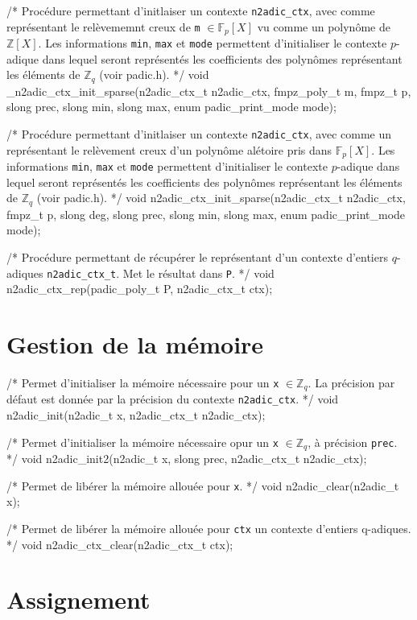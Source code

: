 \documentclass[11pt]{article}
\begin{document}
/* Procédure permettant d'initlaiser un contexte \texttt{n2adic_ctx}, avec comme représentant le relèvememnt creux de \texttt{m} $\in \mathbb{F}_p[X]$ vu comme un polynôme de $\mathbb{Z}[X]$. Les informations \texttt{min}, \texttt{max} et \texttt{mode} permettent d'initialiser le contexte $p$-adique dans lequel seront représentés les coefficients des polynômes représentant les éléments de $\mathbb{Z}_q$ (voir padic.h). */
void _n2adic_ctx_init_sparse(n2adic_ctx_t n2adic_ctx, fmpz_poly_t m, fmpz_t p, slong prec, slong min, slong max, enum padic_print_mode mode);

/* Procédure permettant d'initlaiser un contexte \texttt{n2adic_ctx}, avec comme un représentant le relèvement creux d'un polynôme alétoire pris dans $\mathbb{F}_p[X]$. Les informations \texttt{min}, \texttt{max} et \texttt{mode} permettent d'initialiser le contexte $p$-adique dans lequel seront représentés les coefficients des polynômes représentant les éléments de $\mathbb{Z}_q$ (voir padic.h). */
void n2adic_ctx_init_sparse(n2adic_ctx_t n2adic_ctx, fmpz_t p, slong deg, slong prec, slong min, slong max, enum padic_print_mode mode);

/* Procédure permettant de récupérer le représentant d'un contexte d'entiers $q$-adiques \texttt{n2adic_ctx_t}. Met le résultat dans \texttt{P}. */
void n2adic_ctx_rep(padic_poly_t P, n2adic_ctx_t ctx);


\section{Gestion de la mémoire}

/* Permet d'initialiser la mémoire nécessaire pour un \texttt{x} $\in \mathbb{Z}_q$. La précision par défaut est donnée par la précision du contexte \texttt{n2adic_ctx}. */
void n2adic_init(n2adic_t x, n2adic_ctx_t n2adic_ctx);

/* Permet d'initialiser la mémoire nécessaire opur un \texttt{x} $\in \mathbb{Z}_q$, à précision \texttt{prec}. */
void n2adic_init2(n2adic_t x, slong prec, n2adic_ctx_t n2adic_ctx);

/* Permet de libérer la mémoire allouée pour \texttt{x}. */
void n2adic_clear(n2adic_t x);

/* Permet de libérer la mémoire allouée pour \texttt{ctx} un contexte d'entiers q-adiques. */
void n2adic_ctx_clear(n2adic_ctx_t ctx);


\section{Assignement}
\end{document}
